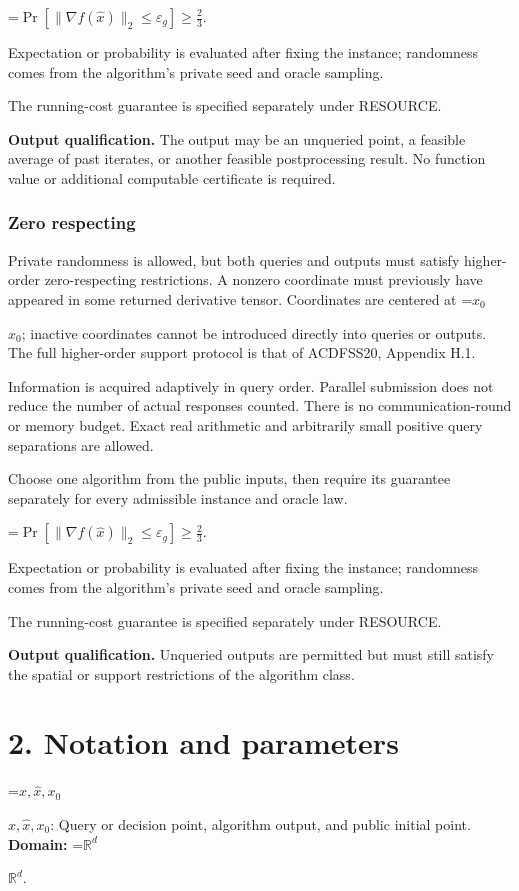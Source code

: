 \documentclass[10pt,a4paper]{article}
\newcommand{\AtlasMath}[1]{\par\begingroup\centering\setbox0=\hbox{$\displaystyle #1$}\ifdim\wd0>1.4\linewidth\typeout{ATLAS WIDE FORMULA: \the\wd0}\fi\ifdim\wd0>\linewidth\resizebox{\linewidth}{!}{\box0}\else\box0\fi\par\endgroup}
\newcommand{\AtlasInlineMath}[1]{\begingroup\setbox0=\hbox{$#1$}\ifdim\wd0>.4\linewidth\endgroup\AtlasMath{#1}\else\endgroup$#1$\fi}
\begin{document}
\AtlasMath{\Pr\!\left[\|\nabla f(\widehat{x})\|_2\le \varepsilon_g\right]\ge\frac23.}


Expectation or probability is evaluated after fixing the instance; randomness comes from the algorithm's private seed and oracle sampling.

The running-cost guarantee is specified separately under RESOURCE.

\textbf{Output qualification.} The output may be an unqueried point, a feasible average of past iterates, or another feasible postprocessing result. No function value or additional computable certificate is required.

\subsubsection{Zero respecting}
Private randomness is allowed, but both queries and outputs must satisfy higher-order zero-respecting restrictions. A nonzero coordinate must previously have appeared in some returned derivative tensor. Coordinates are centered at \AtlasInlineMath{x_0}; inactive coordinates cannot be introduced directly into queries or outputs. The full higher-order support protocol is that of ACDFSS20, Appendix H.1.

Information is acquired adaptively in query order. Parallel submission does not reduce the number of actual responses counted. There is no communication-round or memory budget. Exact real arithmetic and arbitrarily small positive query separations are allowed.

Choose one algorithm from the public inputs, then require its guarantee separately for every admissible instance and oracle law.


\AtlasMath{\Pr\!\left[\|\nabla f(\widehat{x})\|_2\le \varepsilon_g\right]\ge\frac23.}


Expectation or probability is evaluated after fixing the instance; randomness comes from the algorithm's private seed and oracle sampling.

The running-cost guarantee is specified separately under RESOURCE.

\textbf{Output qualification.} Unqueried outputs are permitted but must still satisfy the spatial or support restrictions of the algorithm class.

\section{2. Notation and parameters}
\AtlasInlineMath{x,\widehat{x},x_0}: Query or decision point, algorithm output, and public initial point. \textbf{Domain:} \AtlasInlineMath{\mathbb{R}^d}.
\end{document}
